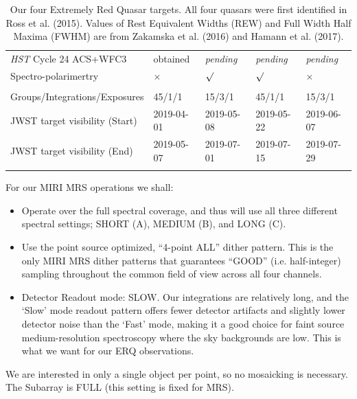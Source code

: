 \begin{table}[h]
\begin{center}
\begin{tabular}{||  l|l|l|l|l ||}
  {\it HST} Cycle 24  ACS+WFC3     & obtained  &  {\it pending}   &{\it pending}  & {\it pending} \\
  Spectro-polarimertry       &   $\times$            &  $\surd$                &  $\surd$           & $\times$  \\
 &&&& \\
Groups/Integrations/Exposures      &  45/1/1              &   15/3/1  &   45/1/1         &   15/3/1         \\
JWST target visibility (Start) & 2019-04-01    & 2019-05-08    & 2019-05-22   & 2019-06-07  \\ 
JWST target visibility (End)  & 2019-05-07    & 2019-07-01     & 2019-07-15   & 2019-07-29   \\ 
 &&&& \\
\hline\hline
      \end{tabular}
\caption{
Our four Extremely Red Quasar targets. All four quasars were first
identified in Ross et al. (2015).  Values of Rest Equivalent Widths
(REW) and Full Width Half Maxima (FWHM) are from Zakamska et
al. (2016) and Hamann et al. (2017).
}
\label{tab:targets} 
  \end{center}
\end{table}

\noindent
For our MIRI MRS operations we shall: 
\begin{itemize}
    \item Operate over the full spectral coverage, and thus will use all three different spectral settings;  
      SHORT (A), MEDIUM (B), and LONG (C). 
    \item Use the point source optimized, ``4-point ALL'' dither pattern.
      This is the only MIRI MRS dither patterns that guarantees ``GOOD''
      (i.e. half-integer) sampling throughout the common field of view
      across all four channels.
    \item{Detector Readout mode: SLOW. 
        Our integrations are relatively long, and the `Slow' mode readout pattern offers fewer detector
        artifacts and slightly lower detector noise than the `Fast' mode,  
        making it a good choice for faint source medium-resolution
        spectroscopy where the sky backgrounds are low. 
        This is what we want for our ERQ observations.}
\end{itemize}
We are interested in only a single object per point, so no mosaicking is necessary.  
The Subarray is FULL (this setting is fixed for MRS). 

